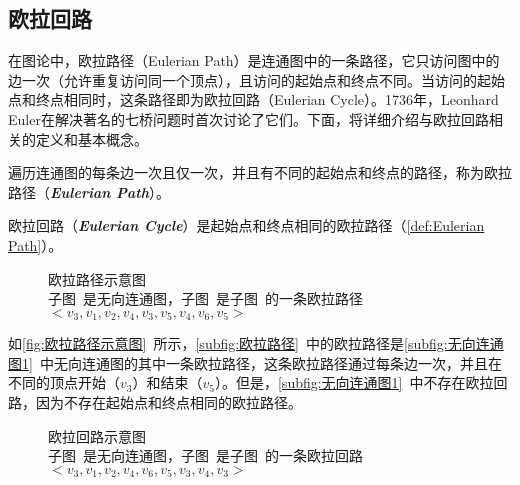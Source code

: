 \subsection{欧拉回路}
\label{subsec:NS_Method:相关定义与基本概念:欧拉回路}
在图论中，欧拉路径（Eulerian Path）是连通图中的一条路径，它只访问图中的边一次（允许重复访问同一个顶点），且访问的起始点和终点不同。当访问的起始点和终点相同时，这条路径即为欧拉回路（Eulerian Cycle）。1736年，Leonhard Euler在解决著名的七桥问题时首次讨论了它们\cite{barnett2005early}。下面，将详细介绍与欧拉回路相关的定义和基本概念。
\begin{definition}[欧拉路径]
    \label{def:Eulerian Path}
    遍历连通图的每条边一次且仅一次，并且有不同的起始点和终点的路径，称为欧拉路径（\emph{\textbf{Eulerian Path}}）。
\end{definition}  
\begin{definition}[欧拉回路]
    \label{def:Eulerian Cycle}
    欧拉回路（\emph{\textbf{Eulerian Cycle}}）是起始点和终点相同的欧拉路径（\autoref{def:Eulerian Path}）。
\end{definition}  
\begin{figure}[htb]
    \quad
    \caption[欧拉路径示意图]{欧拉路径示意图 \\ 子图~是无向连通图，子图~是子图~的一条欧拉路径$<v_3, v_1, v_2, v_4, v_3, v_5, v_4, v_6, v_5>$}
    \label{fig:欧拉路径示意图}
\end{figure}
\par
如\autoref{fig:欧拉路径示意图}~所示，\autoref{subfig:欧拉路径}~中的欧拉路径是\autoref{subfig:无向连通图1}~中无向连通图的其中一条欧拉路径，这条欧拉路径通过每条边一次，并且在不同的顶点开始（$v_3$）和结束（$v_5$）。但是，\autoref{subfig:无向连通图1}~中不存在欧拉回路，因为不存在起始点和终点相同的欧拉路径。
\begin{figure}[htb]
    \quad
    \caption[欧拉回路示意图]{欧拉回路示意图 \\ 子图~是无向连通图，子图~是子图~的一条欧拉回路$<v_3, v_1, v_2, v_4, v_6, v_5, v_3, v_4, v_3>$}
    \label{fig:欧拉回路示意图}
\end{figure}
